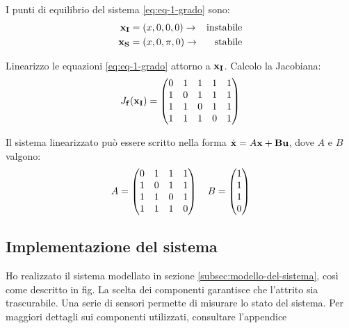 I punti di equilibrio del sistema \eqref{eq:eq-1-grado} sono:
\begin{equation}
  \begin{aligned}
    \bf x_I &= (x, 0, 0, 0) \to & \text{instabile} \\
    \bf x_S &= (x, 0, \pi, 0) \to & \text{stabile}
  \end{aligned}
  \label{eq:punti-equilibrio}
\end{equation}

Linearizzo le equazioni \eqref{eq:eq-1-grado} attorno a $\bf x_I$.
Calcolo la Jacobiana:
\begin{equation}
  J_{\bf f}(\bf x_I) =
  \left(
    \begin{matrix}
      0 & 1 & 1 & 1 & 1\\
      1 & 0 & 1 & 1 & 1\\
      1 & 1 & 0 & 1 & 1\\
      1 & 1 & 1 & 0 & 1
    \end{matrix}
  \right)
  \label{eq:jacobiana}
\end{equation}

Il sistema linearizzato può essere scritto nella forma $\dot {\bf x} = A\bf x + B \bf u$, dove $A$ e $B$ valgono:
\begin{equation}
  A =
  \left(
  \begin{matrix}
    0 & 1 & 1 & 1\\
    1 & 0 & 1 & 1\\
    1 & 1 & 0 & 1\\
    1 & 1 & 1 & 0
  \end{matrix}
  \right)
  \hspace{10px}
  B =
  \left(
  \begin{matrix}
    1\\
    1\\
    1\\
    0
  \end{matrix}
  \right)
  \label{eq:A-e-B}
\end{equation}

\subsection{Implementazione del sistema}\label{subsec:implementazione-del-sistema}
Ho realizzato il sistema modellato in sezione \ref{subsec:modello-del-sistema}, così come descritto in fig. %
La scelta dei componenti garantisce che l'attrito sia trascurabile.
Una serie di sensori permette di misurare lo stato del sistema.
Per maggiori dettagli sui componenti utilizzati, consultare l'appendice %
